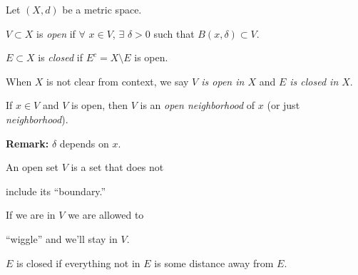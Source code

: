 \documentclass[10pt,aspectratio=149]{beamer}
\begin{document}
\begin{frame}

\begin{definition}
Let $(X,d)$ be a metric space.

\pause
\medskip

$V \subset X$
is \emph{open}
if $\forall$ $x \in V$, $\exists$ $\delta > 0$ such that
$B(x,\delta) \subset V$.

\pause
\medskip

$E \subset X$ is 
\emph{closed} if $E^c = X \setminus E$ is open.

\pause
\medskip

When $X$ is not clear from context,
we say \emph{$V$ is open in $X$} and \emph{$E$ is closed in $X$}.

\pause
\medskip

If $x \in V$ and $V$ is open, then
$V$ is an \emph{open neighborhood} of $x$ (or
just \emph{neighborhood}).
\end{definition}

\pause
\medskip

\hspace*{2.3in}

\pause
\vspace*{-0.9in}

\textbf{Remark:} $\delta$ depends on $x$.

\pause
\medskip

An open set $V$ is a set that does not

include its ``boundary.''

\pause
\medskip

If we are in $V$ we are allowed to

``wiggle'' and we'll stay in $V$.

\pause
\medskip

$E$ is closed if everything not in $E$
is some distance away from $E$.

\end{frame}
\end{document}
